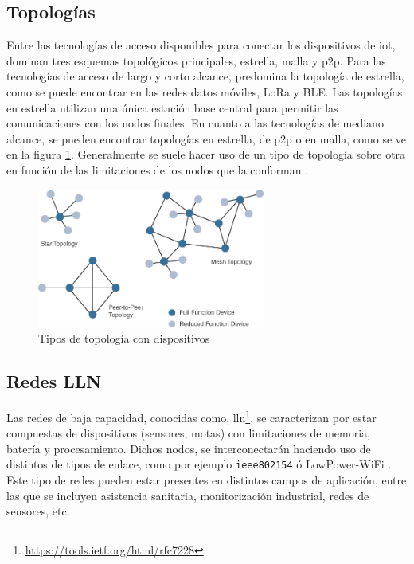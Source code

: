 \subsection{Topologías}

Entre las tecnologías de acceso disponibles para conectar los dispositivos de \gls{iot}, dominan tres esquemas topológicos principales, estrella, malla y p2p. Para las tecnologías de acceso de largo y corto alcance, predomina la topología de estrella, como se puede encontrar en las redes datos móviles, LoRa y BLE. Las topologías en estrella utilizan una única estación base central para permitir las comunicaciones con los nodos finales. En cuanto a las tecnologías de mediano alcance, se pueden encontrar topologías en estrella, de p2p o en malla, como se ve en la figura \ref{fig:iotTopo}. Generalmente se suele hacer uso de un tipo de topología sobre otra en función de las limitaciones de los nodos que la conforman \cite{iotbook}.\\
\par

\begin{figure}[ht]
    \centering
    \includegraphics[width=7.5cm]{archivos/img/teoria/iot_topo.jpg}
    \caption{Tipos de topología con dispositivos  \cite{iotbook}}
    \label{fig:iotTopo}
\end{figure}


\subsection{Redes LLN}

Las redes de baja capacidad, conocidas como, \gls{lln}\footnote{\url{https://tools.ietf.org/html/rfc7228}}, se caracterizan por estar compuestas de dispositivos (sensores, motas) con limitaciones de memoria, batería y procesamiento. Dichos nodos, se interconectarán haciendo uso de distintos de tipos de enlace, como por ejemplo \texttt{ieee802154} ó LowPower-WiFi \cite{llnrfc}. Este tipo de redes pueden estar presentes en distintos campos de aplicación, entre las que se incluyen asistencia sanitaria, monitorización industrial, redes de sensores, etc.   \\


